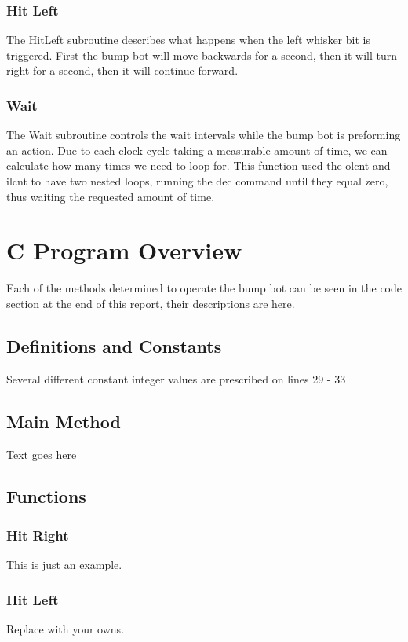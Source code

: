 \documentclass[12pt,letterpaper]{article}
\begin{document}
	\subsubsection{Hit Left}
	The HitLeft subroutine describes what happens when the left whisker bit is triggered. First the bump bot will move backwards for a second, then it will turn right for a second, then it will continue forward. 
	
	\subsubsection{Wait}
	The Wait subroutine controls the wait intervals while the bump bot is preforming an action. Due to each clock cycle taking a measurable amount of time, we can calculate how many times we need to loop for. This function used the olcnt and ilcnt to have two nested loops, running the dec command until they equal zero, thus waiting the requested amount of time.

\section{C Program Overview}
Each of the methods determined to operate the bump bot can be seen in the code section at the end of this report, their descriptions are here.

\subsection{Definitions and Constants}
Several different constant integer values are prescribed on lines 29 - 33

\subsection{Main Method}
Text goes here

\subsection{Functions}
	\subsubsection{Hit Right}
	This is just an example.
	
	\subsubsection{Hit Left}
	Replace with your owns.
\end{document}
